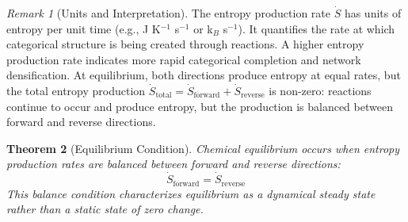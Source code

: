 \documentclass[12pt,a4paper]{article}
\newtheorem{theorem}{Theorem}[section]
\theoremstyle{definition}
\theoremstyle{remark}
\newtheorem{remark}[theorem]{Remark}
\begin{document}
\begin{remark}[Units and Interpretation]
\label{rem:entropy_rate_units}
The entropy production rate $\dot{S}$ has units of entropy per unit time (e.g., J K$^{-1}$ s$^{-1}$ or k$_B$ s$^{-1}$). It quantifies the rate at which categorical structure is being created through reactions. A higher entropy production rate indicates more rapid categorical completion and network densification. At equilibrium, both directions produce entropy at equal rates, but the total entropy production $\dot{S}_{\text{total}} = \dot{S}_{\text{forward}} + \dot{S}_{\text{reverse}}$ is non-zero: reactions continue to occur and produce entropy, but the production is balanced between forward and reverse directions.
\end{remark}

\begin{theorem}[Equilibrium Condition]
\label{thm:equilibrium_condition}
Chemical equilibrium occurs when entropy production rates are balanced between forward and reverse directions:
\begin{equation}
\boxed{\dot{S}_{\text{forward}} = \dot{S}_{\text{reverse}}}
\label{eq:equilibrium_condition}
\end{equation}
This balance condition characterizes equilibrium as a dynamical steady state rather than a static state of zero change.
\end{theorem}
\end{document}
